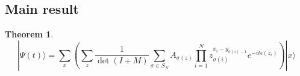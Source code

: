 \documentclass[11pt]{article}
\numberwithin{equation}{section}
\theoremstyle{plain}
\theoremstyle{plain}
\newtheorem{theorem}{Theorem}[section]
\theoremstyle{definition}
\begin{document}
\subsection{Main result}

\begin{theorem}
    \begin{equation}
    | \Psi (t) \rangle = \sum_{x} \left(\sum_{z} \frac{1}{\det(I + M)} \sum_{\sigma \in S_N} A_{\sigma(z)} \prod_{i=1}^{N} z_{\sigma(i)}^{x_i -y_{\sigma(i)-1}} e^{-it \epsilon(z_i)}\right) | x \rangle
    \end{equation}
\end{theorem}







%
%

    
\end{document}
